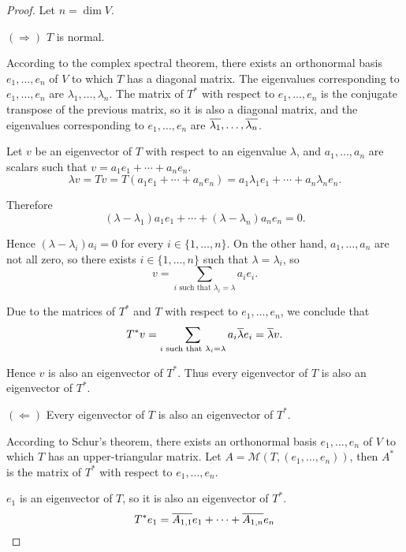 \begin{proof}
    Let $n = \dim V$.

    $(\Rightarrow)$ $T$ is normal.

    According to the complex spectral theorem, there exists an orthonormal basis $e_{1}, \ldots, e_{n}$ of $V$ to which $T$ has a diagonal matrix. The eigenvalues corresponding to $e_{1}, \ldots, e_{n}$ are $\lambda_{1}, \ldots, \lambda_{n}$. The matrix of $T^{*}$ with respect to $e_{1}, \ldots, e_{n}$ is the conjugate transpose of the previous matrix, so it is also a diagonal matrix, and the eigenvalues corresponding to $e_{1}, \ldots, e_{n}$ are $\overline{\lambda_{1}}, \ldots, \overline{\lambda_{n}}$.

    Let $v$ be an eigenvector of $T$ with respect to an eigenvalue $\lambda$, and $a_{1}, \ldots, a_{n}$ are scalars such that $v = a_{1}e_{1} + \cdots + a_{n}e_{n}$.
    \[
        \lambda v = Tv = T(a_{1}e_{1} + \cdots + a_{n}e_{n}) = a_{1}\lambda_{1}e_{1} + \cdots + a_{n}\lambda_{n}e_{n}.
    \]

    Therefore
    \[
        (\lambda - \lambda_{1})a_{1}e_{1} + \cdots + (\lambda - \lambda_{n})a_{n}e_{n} = 0.
    \]

    Hence $(\lambda - \lambda_{i})a_{i} = 0$ for every $i\in\{1,\ldots, n\}$. On the other hand, $a_{1}, \ldots, a_{n}$ are not all zero, so there exists $i\in \{1,\ldots, n\}$ such that $\lambda = \lambda_{i}$, so
    \[
        v = \sum_{i \text{ such that } \lambda_{i} = \lambda}a_{i}e_{i}.
    \]

    Due to the matrices of $T^{*}$ and $T$ with respect to $e_{1}, \ldots, e_{n}$, we conclude that
    \[
        T^{*}v = \sum_{i \text{ such that } \lambda_{i} = \lambda}a_{i}\overline{\lambda}e_{i} = \overline{\lambda}v.
    \]

    Hence $v$ is also an eigenvector of $T^{*}$. Thus every eigenvector of $T$ is also an eigenvector of $T^{*}$.

    \bigskip

    $(\Leftarrow)$ Every eigenvector of $T$ is also an eigenvector of $T^{*}$.

    According to Schur's theorem, there exists an orthonormal basis $e_{1}, \ldots, e_{n}$ of $V$ to which $T$ has an upper-triangular matrix. Let $A = \mathcal{M}(T, (e_{1}, \ldots, e_{n}))$, then $A^{*}$ is the matrix of $T^{*}$ with respect to $e_{1}, \ldots, e_{n}$.

    $e_{1}$ is an eigenvector of $T$, so it is also an eigenvector of $T^{*}$.
    \[
        T^{*}e_{1} = \overline{A_{1,1}}e_{1} + \cdots + \overline{A_{1,n}}e_{n}
    \]


\end{proof}
